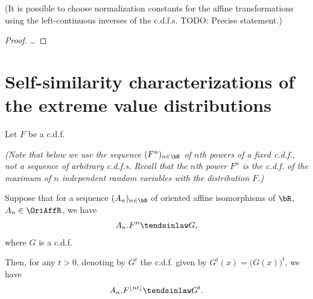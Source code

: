\begin{lemma}
  \label{lemma:convergence-to-types-normalization}
  (It is possible to choose normalization constants for the affine
  transformations using the left-continuous inverses of the c.d.f.s.
  TODO: Precise statement.)
%
%
\end{lemma}
\begin{proof}
  \ldots
\end{proof}

\section{Self-similarity characterizations of the extreme value distributions}

\begin{lemma}
  \label{lem:continuous-parameter-ev-limit}
  Let $F$ be a c.d.f.

  \emph{(Note that below we use
  the sequence $(F^n)_{n \in \bN}$ of $n$th powers of a fixed c.d.f.,
  not a sequence of arbitrary c.d.f.s.
  Recall that the $n$th power $F^n$ is the c.d.f. of the maximum
  of $n$ independent random variables with the distribution $F$.)}

  Suppose that for a sequence $(A_n)_{n \in \bN}$ of oriented
  affine isomorphisms of $\bR$, $A_n \in \OriAffR$, we have
  \begin{align*}
    A_n.F^n \tendsinlaw G ,
  \end{align*}
  where $G$ is a c.d.f.

  Then, for any $t > 0$, denoting by $G^t$ the c.d.f. given by
  $G^t(x) = \big( G(x) \big)^t$, we have
  \begin{align*}
    A_{n}.F^{\lfloor n t \rfloor} \tendsinlaw G^t .
  \end{align*}
\end{lemma}

